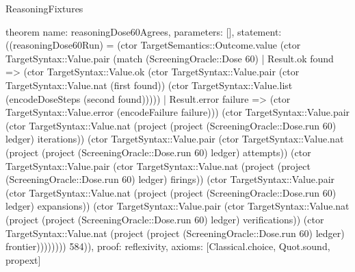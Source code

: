\begin{lexlean}{ReasoningFixtures}
\begin{semanticmodule}
theorem{
  name: reasoningDose60Agrees,
  parameters: [],
  statement: ((reasoningDose60Run) = (ctor TargetSemantics::Outcome.value (ctor TargetSyntax::Value.pair (match (ScreeningOracle::Dose 60)
    | Result.ok found => (ctor TargetSyntax::Value.ok (ctor TargetSyntax::Value.pair (ctor TargetSyntax::Value.nat (first found)) (ctor TargetSyntax::Value.list (encodeDoseSteps (second found)))))
    | Result.error failure => (ctor TargetSyntax::Value.error (encodeFailure failure))) (ctor TargetSyntax::Value.pair (ctor TargetSyntax::Value.nat (project (project (ScreeningOracle::Dose.run 60) ledger) iterations)) (ctor TargetSyntax::Value.pair (ctor TargetSyntax::Value.nat (project (project (ScreeningOracle::Dose.run 60) ledger) attempts)) (ctor TargetSyntax::Value.pair (ctor TargetSyntax::Value.nat (project (project (ScreeningOracle::Dose.run 60) ledger) firings)) (ctor TargetSyntax::Value.pair (ctor TargetSyntax::Value.nat (project (project (ScreeningOracle::Dose.run 60) ledger) expansions)) (ctor TargetSyntax::Value.pair (ctor TargetSyntax::Value.nat (project (project (ScreeningOracle::Dose.run 60) ledger) verifications)) (ctor TargetSyntax::Value.nat (project (project (ScreeningOracle::Dose.run 60) ledger) frontier)))))))) 584)),
  proof: reflexivity{},
  axioms: [Classical.choice, Quot.sound, propext]
}


\end{semanticmodule}
\end{lexlean}
